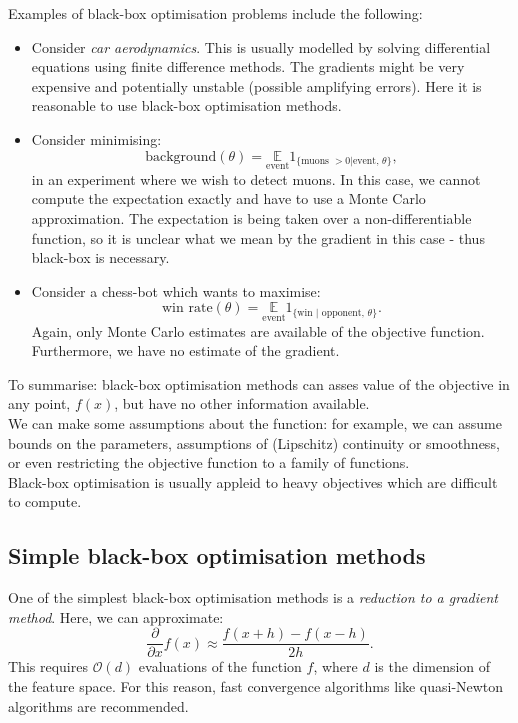 \begin{frameex}
Examples of black-box optimisation problems include the following:
\begin{itemize}
\item Consider \textit{car aerodynamics}. This is usually modelled by solving differential equations using finite difference methods. The gradients might be very expensive and potentially unstable (possible amplifying errors). Here it is reasonable to use black-box optimisation methods.
\item Consider minimising:
\begin{equation*}
\textrm{background}(\theta) = \underset{\textrm{event}}{\mathbb{E}} 1_{\{\text{muons }>0 | \text{event, }\theta\}},
\end{equation*}
in an experiment where we wish to detect muons. In this case, we cannot compute the expectation exactly and have to use a Monte Carlo approximation. The expectation is being taken over a non-differentiable function, so it is unclear what we mean by the gradient in this case - thus black-box is necessary.
\item Consider a chess-bot which wants to maximise:
\begin{equation*}
\textrm{win rate}(\theta) = \underset{\textrm{event}}{\mathbb{E}} 1_{\{\text{win }|\text{ opponent, }\theta\}}.
\end{equation*}
Again, only Monte Carlo estimates are available of the objective function. Furthermore, we have no estimate of the gradient. 
\end{itemize}
\end{frameex}

To summarise: black-box optimisation methods can asses value of the objective in any point, $f(x)$, but have no other information available.\\

We can make some assumptions about the function: for example, we can assume bounds on the parameters, assumptions of (Lipschitz) continuity or smoothness, or even restricting the objective function to a family of functions.\\

Black-box optimisation is usually appleid to heavy objectives which are difficult to compute.



\newpage
\subsection{Simple black-box optimisation methods}
One of the simplest black-box optimisation methods is a \textit{reduction to a gradient method}. Here, we can approximate:
\begin{equation*}
\frac{\partial}{\partial x} f(x) \approx \frac{f(x+h) - f(x-h)}{2h}.
\end{equation*}
This requires $\mathcal{O}(d)$ evaluations of the function $f$, where $d$ is the dimension of the feature space. For this reason, fast convergence algorithms like quasi-Newton algorithms are recommended.\\

